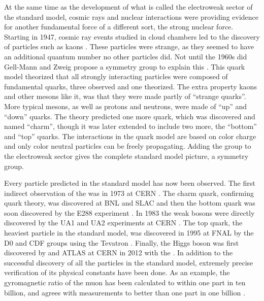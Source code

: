 At the same time as the development of what is called the electroweak sector of the standard model, cosmic rays and nuclear interactions were providing evidence for another fundamental force of a different sort, the strong nuclear force.  Starting in 1947, cosmic ray events studied in cloud chambers led to the discovery of particles such as kaons \cite{1947Natur.160..855R}.  These particles were strange, as they seemed to have an additional quantum number no other particles did.  Not until the 1960s did Gell-Mann and Zweig propose a symmetry group \SUthree to explain this \cite{osti_4082875} \cite{Zweig:352337}.  This quark model theorized that all strongly interacting particles were composed of fundamental quarks, three observed and one theorized.  The extra property kaons and other mesons like it, was that they were made partly of ``strange quarks''.  More typical mesons, as well as protons and neutrons, were made of ``up'' and ``down'' quarks.  The theory predicted one more quark, which was discovered and named ``charm'', though it was later extended to include two more, the ``bottom'' and ``top'' quarks.  The interactions in the quark model are based on color charge and only color neutral particles can be freely propagating.  Adding the \SUthree group to the electroweak sector gives the complete standard model picture, a \SUthreeSUtwoUone symmetry group.

Every particle predicted in the standard model has now been observed.  The first indirect observation of the \Z was in 1973 at CERN \cite{HASERT1973121}.  The charm quark, confirming quark theory, was discovered at BNL and SLAC and then the bottom quark was soon discovered by the E288 experiment \cite{Aubert:1974js}\cite{Augustin:1974xw}\cite{Herb:1977ek}.  In 1983 the weak bosons were directly discovered by the UA1 and UA2 experiments at CERN \cite{Arnison:1983mk}\cite{Bagnaia:1983zx}\cite{Arnison:1983rp}\cite{Banner:1983jy}.  The top quark, the heaviest particle in the standard model, was discovered in 1995 at FNAL by the D0 and CDF groups using the Tevatron \cite{d4eca9bf1d5f49f3a4adc794f80c0a00}\cite{Abachi:1994td}.  Finally, the Higgs boson was first discovered by \CMS and ATLAS at CERN in 2012 with the \LHC.  In addition to the successful discovery of all the particles in the standard model, extremely precise verification of its physical constants have been done.  As an example, the gyromagnetic ratio of the muon has been calculated to within one part in ten billion, and agrees with measurements to better than one part in one billion \cite{PhysRevD.98.030001}.

